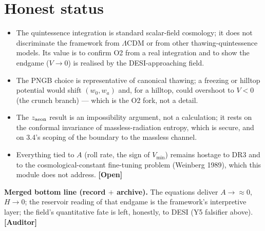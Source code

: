 \documentclass[11pt]{article}
\newcommand{\Open}{\textbf{\textcolor{gray!10!black}{[Open]}}}
\newcommand{\Auditor}{\textbf{\textcolor{teal!55!black}{[Auditor]}}}
\begin{document}
\section{Honest status}
\begin{itemize}[leftmargin=1.3em,itemsep=2pt]
\item The quintessence integration is standard scalar-field cosmology; it does not discriminate the framework from $\Lambda$CDM or from other thawing-quintessence models. Its value is to confirm O2 from a real integration and to show the endgame ($V\!\to\!0$) is realised by the DESI-approaching field.
\item The PNGB choice is representative of canonical thawing; a freezing or hilltop potential would shift $(w_0,w_a)$ and, for a hilltop, could overshoot to $V<0$ (the crunch branch) --- which is the O2 fork, not a detail.
\item The $z_{\rm aeon}$ result is an impossibility argument, not a calculation; it rests on the conformal invariance of massless-radiation entropy, which is secure, and on 3.4's scoping of the boundary to the massless channel.
\item Everything tied to $A$ (roll rate, the sign of $V_{\min}$) remains hostage to DR3 and to the cosmological-constant fine-tuning problem (Weinberg 1989), which this module does not address. \Open
\end{itemize}


\textbf{Merged bottom line (record $+$ archive).} The equations deliver $A\to\approx0$, $H\to0$; the reservoir reading of that endgame is the framework's interpretive layer; the field's quantitative fate is left, honestly, to DESI (Y5 falsifier above). \Auditor

\end{document}
